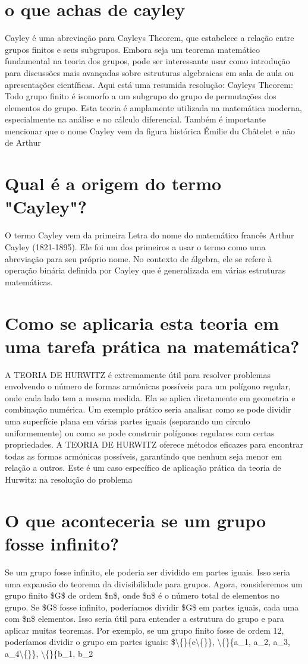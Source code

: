 \documentclass[11pt,a4paper]{article}
\begin{document}
\section{o que achas de cayley}
Cayley é uma abreviação para Cayleys Theorem, que estabelece a relação entre grupos finitos e seus subgrupos. Embora seja um teorema matemático fundamental na teoria dos grupos, pode ser interessante usar como introdução para discussões mais avançadas sobre estruturas algebraicas em sala de aula ou apresentações científicas. Aqui está uma resumida resolução: Cayleys Theorem: Todo grupo finito é isomorfo a um subgrupo do grupo de permutações dos elementos do grupo. Esta teoria é amplamente utilizada na matemática moderna, especialmente na análise e no cálculo diferencial. Também é importante mencionar que o nome Cayley vem da figura histórica Émilie du Châtelet e não de Arthur

\section{Qual é a origem do termo "Cayley"?}
O termo Cayley vem da primeira Letra do nome do matemático francês Arthur Cayley (1821-1895). Ele foi um dos primeiros a usar o termo como uma abreviação para seu próprio nome. No contexto de álgebra, ele se refere à operação binária definida por Cayley que é generalizada em várias estruturas matemáticas.

\section{Como se aplicaria esta teoria em uma tarefa prática na matemática?}
A TEORIA DE HURWITZ é extremamente útil para resolver problemas envolvendo o número de formas armónicas possíveis para um polígono regular, onde cada lado tem a mesma medida. Ela se aplica diretamente em geometria e combinação numérica. Um exemplo prático seria analisar como se pode dividir uma superfície plana em várias partes iguais (separando um círculo uniformemente) ou como se pode construir polígonos regulares com certas propriedades. A TEORIA DE HURWITZ oferece métodos eficazes para encontrar todas as formas armónicas possíveis, garantindo que nenhum seja menor em relação a outros. Este é um caso específico de aplicação prática da teoria de Hurwitz: na resolução do problema

\section{O que aconteceria se um grupo fosse infinito?}
Se um grupo fosse infinito, ele poderia ser dividido em partes iguais. Isso seria uma expansão do teorema da divisibilidade para grupos. Agora, consideremos um grupo finito \$G\$ de ordem \$n\$, onde \$n\$ é o número total de elementos no grupo. Se \$G\$ fosse infinito, poderíamos dividir \$G\$ em partes iguais, cada uma com \$n\$ elementos. Isso seria útil para entender a estrutura do grupo e para aplicar muitas teoremas. Por exemplo, se um grupo finito fosse de ordem 12, poderíamos dividir o grupo em partes iguais: \$\textbackslash\{\}\{e\textbackslash\{\}\}, \textbackslash\{\}\{a\_1, a\_2, a\_3, a\_4\textbackslash\{\}\}, \textbackslash\{\}\{b\_1, b\_2
\end{document}
